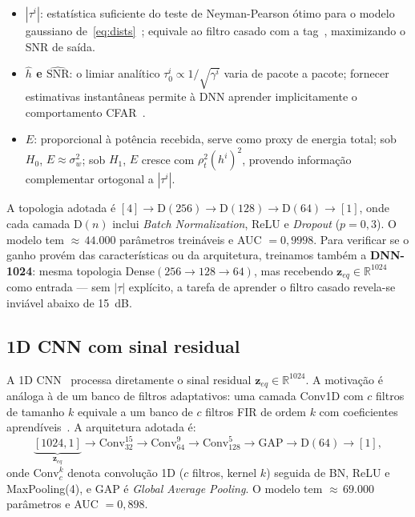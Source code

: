 \documentclass{sbrt}
\begin{document}
\begin{itemize}
  \item \textbf{$|\tau^i|$}: estatística suficiente do teste de Neyman-Pearson ótimo para o modelo gaussiano de~\eqref{eq:dists}~\cite{ref_poor}; equivale ao filtro casado com a tag~\cite{ref_proakis}, maximizando o SNR de saída.
  \item \textbf{$\hat{h}$ e $\widehat{\text{SNR}}$}: o limiar analítico $\tau_0^i \propto 1/\sqrt{\gamma^i}$ varia de pacote a pacote; fornecer estimativas instantâneas permite à DNN aprender implicitamente o comportamento CFAR~\cite{ref_poor}.
  \item \textbf{$E$}: proporcional à potência recebida, serve como proxy de energia total; sob $H_0$, $E \approx \sigma_w^2$; sob $H_1$, $E$ cresce com $\rho_t^2(h^i)^2$, provendo informação complementar ortogonal a $|\tau^i|$.
\end{itemize}

A topologia adotada é $[4] \to \text{D}(256) \to \text{D}(128) \to \text{D}(64) \to [1]$, onde cada camada D$(n)$ inclui \textit{Batch Normalization}, ReLU e \textit{Dropout} ($p = 0{,}3$). O modelo tem ${\approx}\,44{.}000$ parâmetros treináveis e AUC $= 0{,}9998$. Para verificar se o ganho provém das características ou da arquitetura, treinamos também a \textbf{DNN-1024}: mesma topologia Dense$(256\!\to\!128\!\to\!64)$, mas recebendo $\mathbf{z}_{eq} \in \mathbb{R}^{1024}$ como entrada — sem $|\tau|$ explícito, a tarefa de aprender o filtro casado revela-se inviável abaixo de 15~dB.

\subsection{1D CNN com sinal residual}\label{sec:cnn1d}

A 1D CNN~\cite{ref_liao,ref_oshea} processa diretamente o sinal residual $\mathbf{z}_{eq} \in \mathbb{R}^{1024}$. A motivação é análoga à de um banco de filtros adaptativos: uma camada Conv1D com $c$ filtros de tamanho $k$ equivale a um banco de $c$ filtros FIR de ordem $k$ com coeficientes aprendíveis~\cite{ref_proakis}. A arquitetura adotada é:
\begin{equation}\label{eq:cnn}
\underbrace{[1024,1]}_{\mathbf{z}_{eq}}\!\to\!\text{Conv}_{32}^{15}\!\to\!\text{Conv}_{64}^{9}\!\to\!\text{Conv}_{128}^{5}\!\to\!\text{GAP}\!\to\!\text{D}(64)\!\to\![1],
\end{equation}
onde $\text{Conv}_{c}^{k}$ denota convolução 1D ($c$ filtros, kernel $k$) seguida de BN, ReLU e MaxPooling(4), e GAP é \textit{Global Average Pooling}. O modelo tem ${\approx}\,69{.}000$ parâmetros e AUC $= 0{,}898$.
\end{document}

